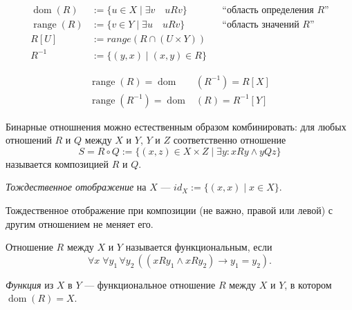\documentclass[12pt,a4paper]{article}
\DeclareMathOperator{\dom}{dom}
\DeclareMathOperator{\range}{range}
\begin{document}
    \begin{definition}
        \begin{align*}
            \dom(R) &:= \{u \in X \mid \exists v\quad uRv\}&& \text{``область определения $R$''}\\
            \range(R) &:= \{v \in Y \mid \exists u\quad uRv\}&& \text{``область значений $R$''}\\
            R[U] &:= range(R \cap (U \times Y))\\
            R^{-1} &:= \{(y, x) \mid (x, y) \in R\}
        \end{align*}
    \end{definition}

    \begin{remark}
        \begin{align*}
            \range(R) = \dom&(R^{-1}) = R[X]\\
            \range(R^{-1}) = \dom&(R) = R^{-1}[Y]
        \end{align*}
    \end{remark}

    \begin{definition}
        Бинарные отношнения можно естественным образом комбинировать: для любых отношений $R$ и $Q$ между $X$ и $Y$, $Y$ и $Z$ соответственно отношение
        \[
            S = R \circ Q := \{(x, z) \in X \times Z \mid \exists y: xRy \wedge yQz\}
        \]
        называется композицией $R$ и $Q$.
    \end{definition}

    \begin{definition}
        \emph{Тождественное отображение} на $X$ --- $id_X := \{(x, x) \mid x \in X\}$.
    \end{definition}

    \begin{remark}
        Тождественное отображение при композиции (не важно, правой или левой) с другим отношением не меняет его. 
    \end{remark}

    \begin{definition}
        Отношение $R$ между $X$ и $Y$ называется функциональным, если
        \[
            \forall x\; \forall y_1\, \forall y_2\, ((xRy_1 \wedge xRy_2) \rightarrow y_1 = y_2).
        \]
    \end{definition}

    \begin{definition}
        \emph{Функция} из $X$ в $Y$ --- функциональное отношение $R$ между $X$ и $Y$, в котором $\dom(R)=X$.
    \end{definition}
\end{document}
